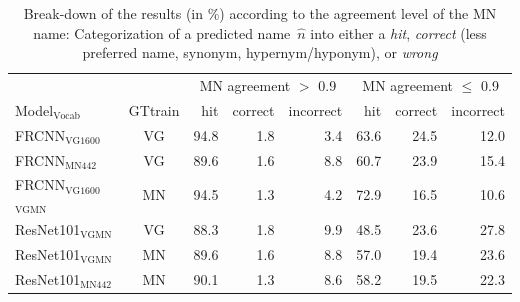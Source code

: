 \begin{table}[t]
	\centering
	\small
	\begin{tabular}{l|c|rrr||rrr}
		\toprule
		& &  \multicolumn{3}{c||}{MN agreement $>$ 0.9} & \multicolumn{3}{c}{MN agreement $\leq$ 0.9}\\
		Model$_{\text{Vocab}}$ &  GTtrain & hit &  correct &  incorrect &  hit &  correct &  incorrect \\
		\midrule
		FRCNN$_{\text{VG1600}}$ & VG &      94.8 &           1.8 &             3.4 &     63.6 &         24.5 &           12.0 \\
		FRCNN$_{\text{MN442}}$ & VG &      89.6 &           1.6 &             8.8 &     60.7 &         23.9 &           15.4 \\
		\midrule \midrule
		FRCNN$_{\text{VG1600}}$$_{\text{VGMN}}$ & MN &      94.5 &           1.3 &             4.2 &     72.9 &         16.5 &           10.6 \\
		\midrule 
		ResNet101$_{\text{VGMN}}$ & VG &      88.3 &           1.8 &             9.9 &     48.5 &         23.6 &           27.8 \\
		ResNet101$_{\text{VGMN}}$ & MN &      89.6 &           1.6 &             8.8 &     57.0 &         19.4 &           23.6 \\
		ResNet101$_{\text{MN442}}$ & MN &      90.1 &           1.3 &             8.6 &     58.2 &         19.5 &           22.3 \\
		\bottomrule
		
	\end{tabular}
	\caption{Break-down of the results (in \%) according to the agreement level of the MN name: Categorization of a predicted name\ $\hat{n}$ into either a \textit{hit}, \textit{correct} (less preferred name, synonym, hypernym/hyponym), or \textit{wrong} \label{tab:exp_errors_agreement}}
\end{table}

